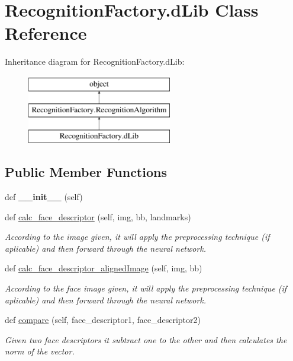 \hypertarget{classRecognitionFactory_1_1dLib}{}\section{Recognition\+Factory.\+d\+Lib Class Reference}
\label{classRecognitionFactory_1_1dLib}
Inheritance diagram for Recognition\+Factory.\+d\+Lib\+:\begin{figure}[H]
\begin{center}
\leavevmode
\includegraphics[height=3.000000cm]{classRecognitionFactory_1_1dLib}
\end{center}
\end{figure}
\subsection*{Public Member Functions}
\begin{DoxyCompactItemize}
\item 
def {\bfseries \+\_\+\+\_\+init\+\_\+\+\_\+} (self)\hypertarget{classRecognitionFactory_1_1dLib_aa5c5fbeb53475fa667bc52a438dbf293}{}\label{classRecognitionFactory_1_1dLib_aa5c5fbeb53475fa667bc52a438dbf293}

\item 
def \hyperlink{classRecognitionFactory_1_1dLib_ab3ed82bd96655fad7d824e91ccf6de15}{calc\+\_\+face\+\_\+descriptor} (self, img, bb, landmarks)
\begin{DoxyCompactList}\small\item\em According to the image given, it will apply the preprocessing technique (if aplicable) and then forward through the neural network. \end{DoxyCompactList}\item 
def \hyperlink{classRecognitionFactory_1_1dLib_a51eecfe3e4e689ca715029362bec4cea}{calc\+\_\+face\+\_\+descriptor\+\_\+aligned\+Image} (self, img, bb)
\begin{DoxyCompactList}\small\item\em According to the face image given, it will apply the preprocessing technique (if aplicable) and then forward through the neural network. \end{DoxyCompactList}\item 
def \hyperlink{classRecognitionFactory_1_1dLib_a519b435395efe6218c3518daf350461e}{compare} (self, face\+\_\+descriptor1, face\+\_\+descriptor2)
\begin{DoxyCompactList}\small\item\em Given two face descriptors it subtract one to the other and then calculates the norm of the vector. \end{DoxyCompactList}\end{DoxyCompactItemize}
